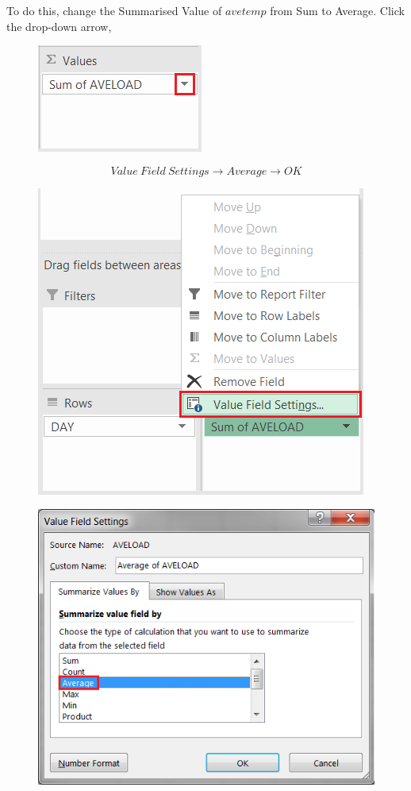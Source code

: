 \documentclass[12pt]{report}
\begin{document}
\newpage
\noindent To do this, change the Summarised Value of $avetemp$ from Sum to Average. Click the drop-down arrow,
\begin{figure}[H]
	\centerline{\includegraphics{q1_8}}
\end{figure}
\vspace{-\baselineskip}
$$Value\ Field\ Settings \to Average \to OK$$
\begin{figure}[H]
	\centerline{\includegraphics{q1_9}}
\end{figure}
\vspace{-\baselineskip}
\begin{figure}[H]
	\centerline{\includegraphics{q1_10}}
\end{figure}
\end{document}
